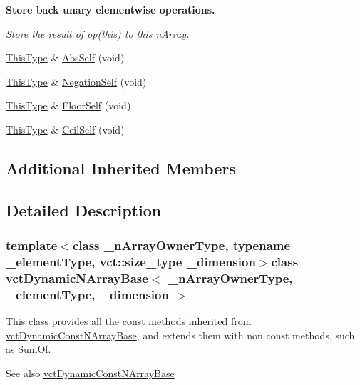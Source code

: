 \begin{Indent}{\bf Store back unary elementwise operations.}\par
{\em Store the result of op(this) to this n\+Array. }\begin{DoxyCompactItemize}
\item 
\hyperlink{classvct_dynamic_const_n_array_base_a5123caffcf1455a1b99003877eade897}{This\+Type} \& \hyperlink{classvct_dynamic_n_array_base_a6ea5477d6846af43ed0ab43edf85d950}{Abs\+Self} (void)
\item 
\hyperlink{classvct_dynamic_const_n_array_base_a5123caffcf1455a1b99003877eade897}{This\+Type} \& \hyperlink{classvct_dynamic_n_array_base_a51cef4d991f6da98e391718e84378917}{Negation\+Self} (void)
\item 
\hyperlink{classvct_dynamic_const_n_array_base_a5123caffcf1455a1b99003877eade897}{This\+Type} \& \hyperlink{classvct_dynamic_n_array_base_a553090c1ad16724aedc7a68408a7d803}{Floor\+Self} (void)
\item 
\hyperlink{classvct_dynamic_const_n_array_base_a5123caffcf1455a1b99003877eade897}{This\+Type} \& \hyperlink{classvct_dynamic_n_array_base_ac34ee1150c9263720e7b8cfd60e9d42c}{Ceil\+Self} (void)
\end{DoxyCompactItemize}
\end{Indent}
\subsection*{Additional Inherited Members}


\subsection{Detailed Description}
\subsubsection*{template$<$class \+\_\+n\+Array\+Owner\+Type, typename \+\_\+element\+Type, vct\+::size\+\_\+type \+\_\+dimension$>$class vct\+Dynamic\+N\+Array\+Base$<$ \+\_\+n\+Array\+Owner\+Type, \+\_\+element\+Type, \+\_\+dimension $>$}

This class provides all the const methods inherited from \hyperlink{classvct_dynamic_const_n_array_base}{vct\+Dynamic\+Const\+N\+Array\+Base}, and extends them with non const methods, such as Sum\+Of.

\begin{DoxySeeAlso}{See also}
\hyperlink{classvct_dynamic_const_n_array_base}{vct\+Dynamic\+Const\+N\+Array\+Base} 
\end{DoxySeeAlso}


